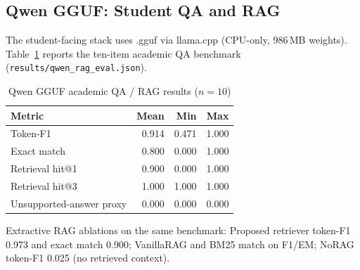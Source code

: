 \subsection{Qwen GGUF: Student QA and RAG}

The student-facing stack uses \qwenmodel{}.gguf via llama.cpp (CPU-only, 986\,MB weights). Table~\ref{tab:qwen_rag_report} reports the ten-item academic QA benchmark (\texttt{results/qwen\_rag\_eval.json}).

\begin{table}[H]
\centering
\small
\caption{Qwen GGUF academic QA / RAG results ($n{=}10$)}
\label{tab:qwen_rag_report}
\begin{tabular}{@{}lrrr@{}}
\toprule
\textbf{Metric} & \textbf{Mean} & \textbf{Min} & \textbf{Max} \\
\midrule
Token-F1 & 0.914 & 0.471 & 1.000 \\
Exact match & 0.800 & 0.000 & 1.000 \\
Retrieval hit@1 & 0.900 & 0.000 & 1.000 \\
Retrieval hit@3 & 1.000 & 1.000 & 1.000 \\
Unsupported-answer proxy & 0.000 & 0.000 & 0.000 \\
\bottomrule
\end{tabular}
\end{table}

Extractive RAG ablations on the same benchmark: Proposed retriever token-F1 0.973 and exact match 0.900; VanillaRAG and BM25 match on F1/EM; NoRAG token-F1 0.025 (no retrieved context).

\begin{table}[H]
\centering
\footnotesize
\caption{RAG ablation comparison (same benchmark)}
\label{tab:qa_ablation_report}
\end{table}

